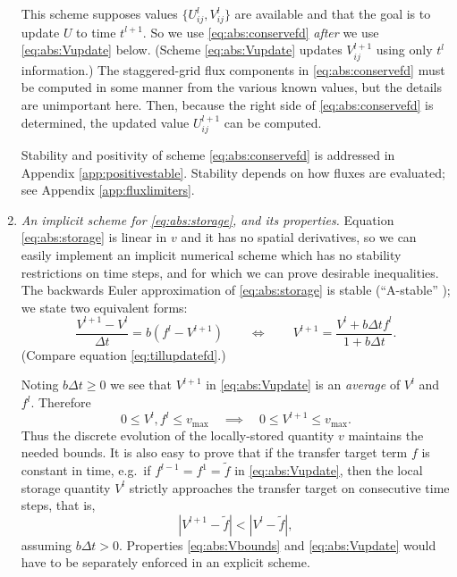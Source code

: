 \documentclass[11pt,final]{amsart}
\begin{document}
\begin{enumerate}
This scheme supposes values $\{U_{ij}^l,V_{ij}^l\}$ are available and that the goal is to update $U$ to time $t^{l+1}$.  So we use \eqref{eq:abs:conservefd} \emph{after} we use \eqref{eq:abs:Vupdate} below.  (Scheme \eqref{eq:abs:Vupdate} updates $V_{ij}^{l+1}$ using only $t^l$ information.)  The staggered-grid flux components in \eqref{eq:abs:conservefd} must be computed in some manner from the various known values, but the details are unimportant here.  Then, because the right side of \eqref{eq:abs:conservefd} is determined, the updated value $U_{ij}^{l+1}$ can be computed.

Stability and positivity of scheme \eqref{eq:abs:conservefd} is addressed in Appendix \ref{app:positivestable}.  Stability depends on how fluxes are evaluated; see Appendix \ref{app:fluxlimiters}.
\medskip

\item \emph{An implicit scheme for \eqref{eq:abs:storage}, and its properties.}  Equation \eqref{eq:abs:storage} is linear in $v$ and it has no spatial derivatives, so we can easily implement an implicit numerical scheme which has no stability restrictions on time steps, and for which we can prove desirable inequalities.  The backwards Euler approximation of \eqref{eq:abs:storage} is stable (``A-stable'' \citep{AscherPetzold}); we state two equivalent forms:
\begin{equation}
\frac{V^{l+1} - V^l}{\Delta t} = b \left(f^l - V^{l+1}\right) \qquad \iff \qquad
V^{l+1} = \frac{V^l + b \Delta t f^l}{1 + b \Delta t}.  \label{eq:abs:Vupdate}
\end{equation}
(Compare equation \eqref{eq:tillupdatefd}.)

Noting $b \Delta t \ge 0$ we see that $V^{l+1}$ in \eqref{eq:abs:Vupdate} is an \emph{average} of $V^l$ and $f^l$.  Therefore
\begin{equation}
0 \le V^l, f^l \le v_{\text{max}} \quad \implies \quad 0 \le V^{l+1} \le v_{\text{max}}. \label{eq:abs:Vbounds}
\end{equation}
Thus the discrete evolution of the locally-stored quantity $v$ maintains the needed bounds.  It is also easy to prove that if the transfer target term $f$ is constant in time, e.g.~if $f^{l-1}=f^1=\tilde f$ in \eqref{eq:abs:Vupdate}, then the local storage quantity $V^l$ strictly approaches the transfer target on consecutive time steps, that is,
\begin{equation}
\left|V^{l+1} - \tilde f\right| < \left|V^l - \tilde f\right|, \label{eq:abs:Vapproach}
\end{equation}
assuming $b\Delta t > 0$.  Properties \eqref{eq:abs:Vbounds} and \eqref{eq:abs:Vupdate} would have to be separately enforced in an explicit scheme.
\medskip


\end{enumerate}
\end{document}
